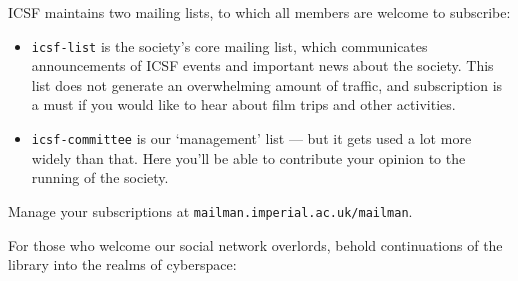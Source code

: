

ICSF maintains two mailing lists, to which all members are welcome to
subscribe:

\begin{itemize}
\item \texttt{icsf-list}
is the society’s core mailing list, which communicates announcements
of ICSF events and important news about the society. This list does
not generate an overwhelming amount of traffic, and subscription is a
must if you would like to hear about film trips and other activities.

\item \texttt{icsf-committee}
is our ‘management’ list --- but it gets used a lot more
widely than that. Here you’ll be able to contribute your opinion to
the running of the society.
\end{itemize}

Manage your subscriptions at \texttt{mailman.imperial.ac.uk/mailman}.

For those who welcome our social network overlords, behold
continuations of the library into the realms of cyberspace:




\par
